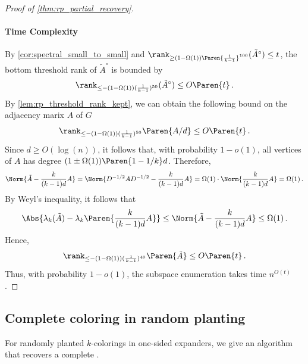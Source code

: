 \begin{proof}[Proof of \cref{thm:rp_partial_recovery}]
    \paragraph{Time Complexity}
    By \cref{cor:spectral_small_to_small} and $\rank_{\geq (1-\Omega(1)) \Paren{\frac{1}{k-1}}^{100}}(\tilde{A}^{\circ}) \leq t$, the bottom threshold rank of $\tilde{A}^{\circ}$ is bounded by
    \begin{equation*}
        \rank_{\leq - (1-\Omega(1))(\frac{1}{k-1})^{50}}(\tilde{A}^{\circ}) \leq O \Paren{t} \,.
    \end{equation*}
    By \cref{lem:rp_threshold_rank_kept}, we can obtain the following bound on the adjacency marix $A$ of $G$
    \begin{equation*}
        \rank_{\leq - (1-\Omega(1))(\frac{1}{k-1})^{50}} \Paren{A/d} \leq O \Paren{t} \,.
    \end{equation*}
    Since $d \geq O(\log(n))$, it follows that, with probability $1-o(1)$, all vertices of $A$ has degree $(1 \pm \Omega(1)) \Paren{1-1/k} d$. Therefore,
    \begin{equation*}
        \Norm{\tilde{A} - \frac{k}{(k-1)d} A}
        = \Norm{D^{-1/2} A D^{-1/2} - \frac{k}{(k-1)d} A}
        = \Omega(1) \cdot \Norm{\frac{k}{(k-1)d} A}
        = \Omega(1) \,.
    \end{equation*}
    By Weyl's inequality, it follows that
    \begin{equation*}
        \Abs{\lambda_k (\tilde{A}) - \lambda_k \Paren{\frac{k}{(k-1)d} A}}
        \leq \Norm{\tilde{A} - \frac{k}{(k-1)d} A}
        \leq \Omega(1) \,.
    \end{equation*}
    Hence,
    \begin{equation*}
        \rank_{\leq - (1-\Omega(1))(\frac{1}{k-1})^{40}} \Paren{\tilde{A}} \leq O \Paren{t} \,.
    \end{equation*}
    Thus, with probability $1-o(1)$, the subspace enumeration takes time $n^{O(t)}$.
\end{proof}

\subsection{Complete coloring in random planting}

For randomly planted $k$-colorings in one-sided expanders, we give an algorithm that \whp recovers a complete \kcl.



